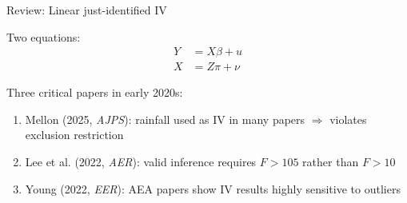 \documentclass[aspectratio=169]{beamer}
\begin{document}
\begin{frame}

Review: Linear just-identified IV

\bigskip

Two equations:
\begin{align*}
Y &= X\beta + u \\
X &= Z\pi + \nu
\end{align*}



\end{frame}




\begin{frame}

Three critical papers in early 2020s:
\bigskip\par
\begin{enumerate}
\itemsep1.5em
\item<2-> Mellon (2025, \textit{AJPS}): rainfall used as IV in many papers $\Rightarrow$ violates exclusion restriction

\item<3-> Lee et al. (2022, \textit{AER}): valid inference requires $F > 105$ rather than $F > 10$

\item<4-> Young (2022, \textit{EER}): AEA papers show IV results highly sensitive to outliers

\end{enumerate}

\end{frame}
\end{document}
